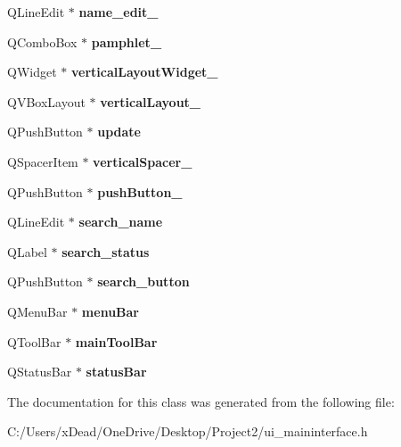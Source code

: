 \begin{DoxyCompactItemize}
Q\+Line\+Edit $\ast$ {\bfseries name\+\_\+edit\+\_}
\item 
\mbox{\label{class_ui___main_interface_ac6841c1c7a98a96952fdaab142f20e20}} 
Q\+Combo\+Box $\ast$ {\bfseries pamphlet\+\_}
\item 
\mbox{\label{class_ui___main_interface_ae6e747b1a20a4c2247f29d768724d708}} 
Q\+Widget $\ast$ {\bfseries vertical\+Layout\+Widget\+\_}
\item 
\mbox{\label{class_ui___main_interface_a84a23a889bf9e557088cf5a32330374a}} 
Q\+V\+Box\+Layout $\ast$ {\bfseries vertical\+Layout\+\_}
\item 
\mbox{\label{class_ui___main_interface_a78ae9bea971b72c4c36ae31b59fb3890}} 
Q\+Push\+Button $\ast$ {\bfseries update}
\item 
\mbox{\label{class_ui___main_interface_a96a43385945038256ede25c1b27593c6}} 
Q\+Spacer\+Item $\ast$ {\bfseries vertical\+Spacer\+\_}
\item 
\mbox{\label{class_ui___main_interface_aeb037a1a90e16711bfe1a3da8a538b5b}} 
Q\+Push\+Button $\ast$ {\bfseries push\+Button\+\_}
\item 
\mbox{\label{class_ui___main_interface_aeb0a727b362c9609b907c45190e167ff}} 
Q\+Line\+Edit $\ast$ {\bfseries search\+\_\+name}
\item 
\mbox{\label{class_ui___main_interface_a4fe3dadca899cea54a5ec561d894e9be}} 
Q\+Label $\ast$ {\bfseries search\+\_\+status}
\item 
\mbox{\label{class_ui___main_interface_a9ea52192665fd7ac93028fdc5e71c88f}} 
Q\+Push\+Button $\ast$ {\bfseries search\+\_\+button}
\item 
\mbox{\label{class_ui___main_interface_add0e7b9294347491cb19ee19535b55aa}} 
Q\+Menu\+Bar $\ast$ {\bfseries menu\+Bar}
\item 
\mbox{\label{class_ui___main_interface_aadd6906c04660d3da1db5ac662a85bd1}} 
Q\+Tool\+Bar $\ast$ {\bfseries main\+Tool\+Bar}
\item 
\mbox{\label{class_ui___main_interface_af38f3a78a771c2fc54bed35c27a3668c}} 
Q\+Status\+Bar $\ast$ {\bfseries status\+Bar}
\end{DoxyCompactItemize}


The documentation for this class was generated from the following file\+:\begin{DoxyCompactItemize}
\item 
C\+:/\+Users/x\+Dead/\+One\+Drive/\+Desktop/\+Project2/ui\+\_\+maininterface.\+h\end{DoxyCompactItemize}
